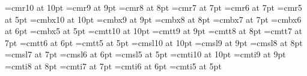 \font\tenrm=cmr10 at 10pt
\font\ninerm=cmr9 at 9pt
\font\eightrm=cmr8 at 8pt
\font\sevenrm=cmr7 at 7pt
\font\sixrm=cmr6 at 7pt
\font\fiverm=cmr5 at 5pt
\font\tenbf=cmbx10 at 10pt
\font\ninebf=cmbx9 at 9pt
\font\eightbf=cmbx8 at 8pt
\font\sevenbf=cmbx7 at 7pt
\font\sixbf=cmbx6 at 6pt
\font\fivebf=cmbx5 at 5pt
%
\font\tentt=cmtt10 at 10pt
\font\ninett=cmtt9 at 9pt
\font\eighttt=cmtt8 at 8pt
\font\seventt=cmtt7 at 7pt
\font\sixtt=cmtt6 at 6pt
\font\fivett=cmtt5 at 5pt
%
\font\tensl=cmsl10 at 10pt
\font\ninesl=cmsl9 at 9pt
\font\eightsl=cmsl8 at 8pt
\font\sevensl=cmsl7 at 7pt
\font\sixsl=cmsl6 at 6pt
\font\fivesl=cmsl5 at 5pt
%
\font\tenit=cmti10 at 10pt
\font\nineit=cmti9 at 9pt
\font\eightit=cmti8 at 8pt
\font\sevenit=cmti7 at 7pt
\font\sixit=cmti6 at 6pt
\font\fiveit=cmti5 at 5pt



